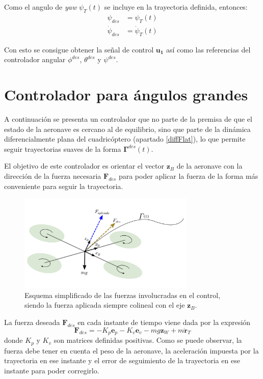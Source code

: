 Como el angulo de \textit{yaw} $\psi_T(t)$ se incluye en la trayectoria definida, entonces:
\begin{align}
	\psi_{des} &= \psi_T(t)\\
		\dot\psi_{des} &= \dot\psi_T(t)
\end{align} 

Con esto se consigue obtener la señal de control $\mathbf{u_1}$ así como las referencias del controlador angular $\phi^{des}$, $\theta^{des}$ y $\psi^{des}$.

\section{Controlador para ángulos grandes}
A continuación se presenta un controlador que no parte de la premisa de que el estado de la aeronave es cercano al de equilibrio, sino que parte de la dinámica diferencialmente plana del cuadricóptero (apartado \ref{diffFlat}), lo que permite seguir trayectorias suaves de la forma $\mathbf{\Gamma}^{des}(t)$.

El objetivo de este controlador es orientar el vector $\mathbf{z}_B$ de la aeronave con la dirección de la fuerza necesaria $\mathbf{F}_{des}$ para poder aplicar la fuerza de la forma más conveniente para seguir la trayectoria.
\begin{figure}[htb!]
	\centering
	\includegraphics[width=0.75\textwidth]{imagenes/control2}
	\caption{Esquema simplificado de las fuerzas involucradas en el control, siendo la fuerza aplicada siempre colineal con el eje $\mathbf{z}_B$. }
	\label{modelado:uav_coordinte}
\end{figure}


La fuerza deseada $\mathbf{F}_{des}$ en cada instante de tiempo viene dada por la expresión
\begin{equation}
	\mathbf{F}_{des} = -K_p	\mathbf{e}_p - K_v	\mathbf{e}_v - mg	\mathbf{z}_W + m	\mathbf{\ddot r}_T
\end{equation}
donde $K_p$ y $K_v$ son matrices definidas positivas.
Como se puede observar, la fuerza debe tener en cuenta el peso de la aeronave, la aceleración impuesta por la trayectoria en ese instante y el error de seguimiento de la trayectoria en ese instante para poder corregirlo.

